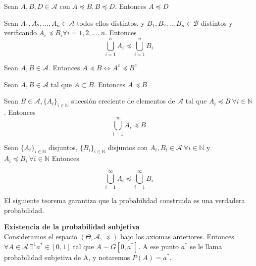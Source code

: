 \documentclass{article}
\begin{document}
    \begin{lem}
        Sean $A,B,D\in\mathcal{A}$ con $A \preceq B, B \preceq D$. Entonces $A \preceq D$
    \end{lem}

    \begin{lem}
        Sean $A_1,A_2,...,A_n \in \mathcal{A} $ todos ellos distintos, y $ B_1,B_2,..,B_n \in \mathcal{B}$ distintos y verificando $A_i \preceq B_i \forall i = 1,2,...,n$. Entonces
        $$ \bigcup\limits_{i = 1}^{n}A_i \preceq \bigcup\limits_{i = 1}^{n}B_i$$
    \end{lem}

    \begin{lem}
        Sean $A,B \in \mathcal{A}$. Entonces
        $A \preceq B \Longleftrightarrow A^c \preceq B^c$
    \end{lem}

    \begin{lem}
        Sean $A,B\in \mathcal{A}$ tal que $A\subset B$. Entonces $A \preceq B$
    \end{lem}

    \begin{lem}
        Sean $B \in \mathcal{A}, \{A_i\}_{i \in \mathbb{N}}$ sucesión creciente de elementos de $\mathcal{A}$ tal que $A_i \preceq B\ \forall i \in \mathbb{N}$. Entonces
        $$ \bigcup\limits_{i = 1}^{\infty}A_i \preceq B$$
    \end{lem}

    \begin{thm}
        Sean $\{A_i\}_{i\in \mathbb{N}} $ disjuntos, $\{B_i\}_{i\in \mathbb{N}} $ disjuntos con $A_i,B_i \in \mathcal{A} \ \forall i \in \mathbb{N}$ y $A_i \preceq B_i \ \forall i \in \mathbb{N}$ Entonces

        $$ \bigcup\limits_{i = 1}^{\infty}A_i \preceq \bigcup\limits_{i = 1}^{\infty}B_i $$
    \end{thm}

    El siguiente teorema garantiza que la probabilidad construida es una verdadera probabilidad.

    \begin{thm}\textbf{Existencia de la probabilidad subjetiva}\\
        Consideramos el espacio $(\Theta, \mathcal{A}, \preceq )$ bajo los axiomas anteriores. Entonces $\forall A \in \mathcal{A} \ \exists^1a^*\in[0,1]$ tal que $A \sim G[0,a^*]$.
        A ese punto $a^*$ se le llama probabilidad subjetiva de A, y notaremos $P(A)=a^*$.
    \end{thm}
\end{document}
